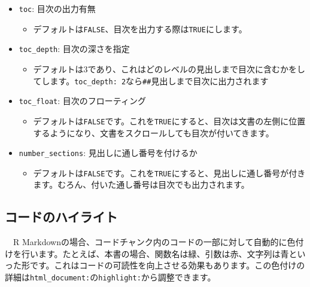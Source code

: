 \documentclass[
  a4paper,
  pandoc,
  ja=standard,
  jafont=haranoaji]{bxjsbook}
\providecommand{\tightlist}{%
  \setlength{\itemsep}{0pt}\setlength{\parskip}{0pt}}
\begin{document}
\begin{itemize}
\tightlist
\item
  \texttt{toc}: 目次の出力有無

  \begin{itemize}
  \tightlist
  \item
    デフォルトは\texttt{FALSE}、目次を出力する際は\texttt{TRUE}にします。
  \end{itemize}
\item
  \texttt{toc\_depth}: 目次の深さを指定

  \begin{itemize}
  \tightlist
  \item
    デフォルトは3であり、これはどのレベルの見出しまで目次に含むかをしてします。\texttt{toc\_depth:\ 2}なら\texttt{\#\#}見出しまで目次に出力されます
  \end{itemize}
\item
  \texttt{toc\_float}: 目次のフローティング

  \begin{itemize}
  \tightlist
  \item
    デフォルトは\texttt{FALSE}です。これを\texttt{TRUE}にすると、目次は文書の左側に位置するようになり、文書をスクロールしても目次が付いてきます。
  \end{itemize}
\item
  \texttt{number\_sections}: 見出しに通し番号を付けるか

  \begin{itemize}
  \tightlist
  \item
    デフォルトは\texttt{FALSE}です。これを\texttt{TRUE}にすると、見出しに通し番号が付きます。むろん、付いた通し番号は目次でも出力されます。
  \end{itemize}
\end{itemize}

\hypertarget{ux30b3ux30fcux30c9ux306eux30cfux30a4ux30e9ux30a4ux30c8}{%
\subsection{コードのハイライト}\label{ux30b3ux30fcux30c9ux306eux30cfux30a4ux30e9ux30a4ux30c8}}

　R
Markdownの場合、コードチャンク内のコードの一部に対して自動的に色付けを行います。たとえば、本書の場合、関数名は緑、引数は赤、文字列は青といった形です。これはコードの可読性を向上させる効果もあります。この色付けの詳細は\texttt{html\_document:}の\texttt{highlight:}から調整できます。
\end{document}
